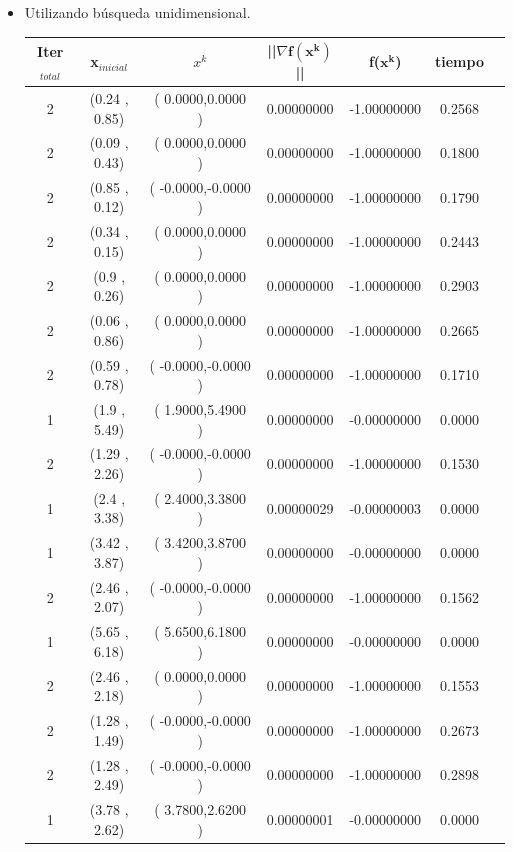     \begin{itemize}
        \item Utilizando búsqueda unidimensional.

\begin{table}[H]
\centering
\renewcommand{\arraystretch}{1.2} 
\begin{tabular}{|c|c|c|c|c|c|c|}
\hline
\textbf{Iter$_{total}$} &\textbf{x$_{inicial}$} & \textbf{$x^k$} & \textbf{||$\nabla \mathbf{f(x^k)}$}|| & \textbf{f($\mathbf{x^k}$)} &  \textbf{tiempo} \\
\hline
2  &  (0.24 , 0.85) &( 0.0000,0.0000 ) & 0.00000000 & -1.00000000 & 0.2568 \\
2  &  (0.09 , 0.43) &( 0.0000,0.0000 ) & 0.00000000 & -1.00000000 & 0.1800 \\
2  &  (0.85 , 0.12) &( -0.0000,-0.0000 ) & 0.00000000 & -1.00000000 & 0.1790 \\
2  &  (0.34 , 0.15) &( 0.0000,0.0000 ) & 0.00000000 & -1.00000000 & 0.2443 \\
2  &  (0.9 , 0.26) &( 0.0000,0.0000 ) & 0.00000000 & -1.00000000 & 0.2903 \\
2  &  (0.06 , 0.86) &( 0.0000,0.0000 ) & 0.00000000 & -1.00000000 & 0.2665 \\
2  &  (0.59 , 0.78) &( -0.0000,-0.0000 ) & 0.00000000 & -1.00000000 & 0.1710 \\
1  &  (1.9 , 5.49) &( 1.9000,5.4900 ) & 0.00000000 & -0.00000000 & 0.0000 \\
2  &  (1.29 , 2.26) &( -0.0000,-0.0000 ) & 0.00000000 & -1.00000000 & 0.1530 \\
1  &  (2.4 , 3.38) &( 2.4000,3.3800 ) & 0.00000029 & -0.00000003 & 0.0000 \\
1  &  (3.42 , 3.87) &( 3.4200,3.8700 ) & 0.00000000 & -0.00000000 & 0.0000 \\
2  &  (2.46 , 2.07) &( -0.0000,-0.0000 ) & 0.00000000 & -1.00000000 & 0.1562 \\
1  &  (5.65 , 6.18) &( 5.6500,6.1800 ) & 0.00000000 & -0.00000000 & 0.0000 \\
2  &  (2.46 , 2.18) &( 0.0000,0.0000 ) & 0.00000000 & -1.00000000 & 0.1553 \\
2  &  (1.28 , 1.49) &( -0.0000,-0.0000 ) & 0.00000000 & -1.00000000 & 0.2673 \\
2  &  (1.28 , 2.49) &( -0.0000,-0.0000 ) & 0.00000000 & -1.00000000 & 0.2898 \\
1  &  (3.78 , 2.62) &( 3.7800,2.6200 ) & 0.00000001 & -0.00000000 & 0.0000 \\


\end{tabular}
\end{table}
\end{itemize}
